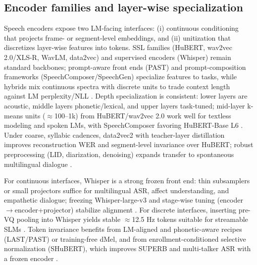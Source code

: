 \documentclass{article}
\begin{document}
\subsection{Encoder families and layer-wise specialization} \label{subsec:encoderfamiliesandlayer-wisespecialization}
Speech encoders expose two LM-facing interfaces: (i) continuous conditioning that projects frame- or segment-level embeddings, and (ii) unitization that discretizes layer-wise features into tokens. SSL families (HuBERT, wav2vec 2.0/XLS-R, WavLM, data2vec) and supervised encoders (Whisper) remain standard backbones; prompt-aware front ends (PAST) and prompt-composition frameworks (SpeechComposer/SpeechGen) specialize features to tasks, while hybrids mix continuous spectra with discrete units to trade context length against LM perplexity/NLL \cite{har-tuv2025pastphoneticacousticspeechtokenizer,wu2024speechcomposerunifyingmultiplespeechtask,wu2023speechgenunlockinggenerativepowerspeechl,verma2024whispergpthybridrepresentationaudiolarge}. Depth specialization is consistent: lower layers are acoustic, middle layers phonetic/lexical, and upper layers task-tuned; mid-layer k-means units ($\approx$100--1k) from HuBERT/wav2vec 2.0 work well for textless modeling and spoken LMs, with SpeechComposer favoring HuBERT-Base L6 \cite{hsu2024exploringcontextlearningtextlessspeechla,wu2024speechcomposerunifyingmultiplespeechtask}. Under coarse, syllabic cadences, data2vec2 with teacher-layer distillation improves reconstruction WER and segment-level invariance over HuBERT; robust preprocessing (LID, diarization, denoising) expands transfer to spontaneous multilingual dialogue \cite{baade2024syllablelmlearningcoarsesemanticunitsspe,nakata2024jchatjapaneselargescalespokendialoguecor}.

For continuous interfaces, Whisper is a strong frozen front end: thin subsamplers or small projectors suffice for multilingual ASR, affect understanding, and empathetic dialogue; freezing Whisper-large-v3 and stage-wise tuning (encoder$\rightarrow$encoder+projector) stabilize alignment \cite{wang2024blspemotowardsempatheticlargespeechlangu,li2025transsionmultilingualspeechrecognitionsy,nguyen2025qwenvsgemmaintegrationwhispercomparative}. For discrete interfaces, inserting pre-VQ pooling into Whisper yields stable $\approx$12.5 Hz tokens suitable for streamable SLMs \cite{zeng2024scalingspeechtextpretrainingsyntheticint}. Token invariance benefits from LM-aligned and phonetic-aware recipes (LAST/PAST) or training-free dMel, and from enrollment-conditioned selective normalization (SHuBERT), which improves SUPERB and multi-talker ASR with a frozen encoder \cite{turetzky2024lastlanguagemodelawarespeechtokenization,har-tuv2025pastphoneticacousticspeechtokenizer,bai2025dmelspeechtokenizationmadesimple,entry2025selectivehubertselfsupervisedpretraining}.
\end{document}
